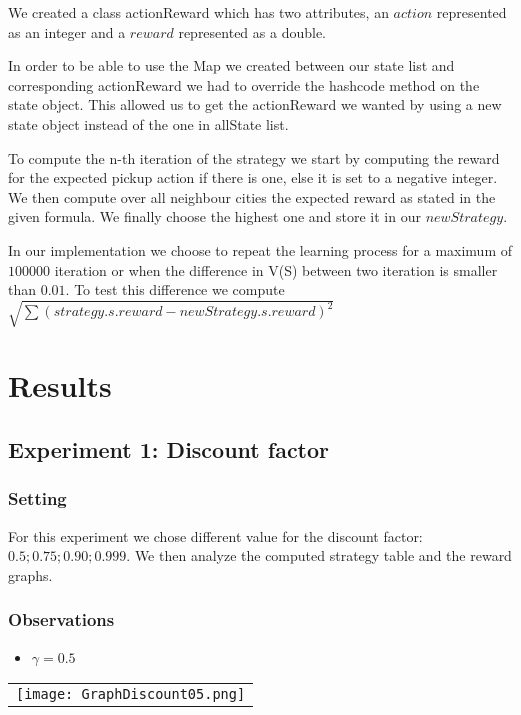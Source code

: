 \documentclass[11pt]{article}
\begin{document}
We created a class actionReward which has two attributes, an $action$ represented as an integer and a $reward$ represented as a double.

In order to be able to use the Map we created between our state list and corresponding actionReward we had to override the hashcode method on the state object. This allowed us to get the actionReward we wanted by using a new state object instead of the one in allState list.

To compute the n-th iteration of the strategy we start by computing the reward for the expected pickup action if there is one, else it is set to a negative integer. We then compute over all neighbour cities the expected reward as stated in the given formula. We finally choose the highest one and store it in our $newStrategy$.

In our implementation we choose to repeat the learning process for a maximum of $100000$ iteration or when the difference in V(S) between two iteration is smaller than $0.01$. To test this difference we compute $\sqrt{\sum(strategy.s.reward-newStrategy.s.reward)^2}$

\section{Results}

\subsection{Experiment 1: Discount factor}

\subsubsection{Setting}
For this experiment we chose different value for the discount factor: $0.5;0.75;0.90;0.999$. We then analyze the computed strategy table and the reward graphs.


\subsubsection{Observations}
\begin{itemize}
\item $\gamma = 0.5$
\end{itemize}
\begin{tabular}{|c|}
\texttt{[image: GraphDiscount05.png]}
\end{tabular}
\end{document}
